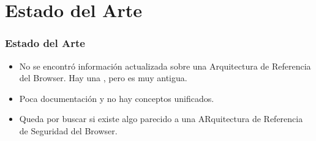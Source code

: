 \documentclass[serif,9pt]{beamer}
\begin{document}


\section{Estado del Arte}
\begin{frame}
	\frametitle{Estado del Arte}
	\begin{itemize}
		\item No se encontr\'o informaci\'on actualizada sobre una Arquitectura de Referencia del Browser. Hay una \cite{preprint-grosskurth-browser-archevol}, pero es muy antigua.
		\item Poca documentaci\'on y no hay conceptos unificados.
		\item Queda por buscar si existe algo parecido a una ARquitectura de Referencia de Seguridad del Browser.
	\end{itemize}
\end{frame}
\end{document}
